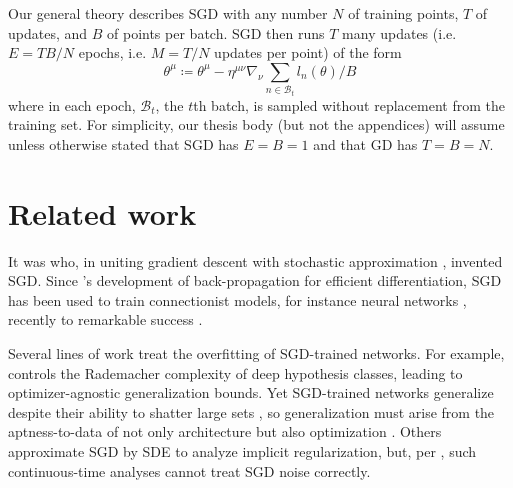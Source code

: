 \documentclass[openany, notitlepage, justified]{tufte-book}
\theoremstyle{plain}
\theoremstyle{definition}
\newcommand{\Bb}{\mathcal{B}}
\begin{document}

        Our general theory describes SGD with any number
             $N$ of training points,
             $T$ of updates, and 
             $B$ of points per batch.
        SGD then runs $T$ many updates (i.e. $E=TB/N$ epochs, i.e. $M=T/N$
        updates per point) of the form
        $$
            \theta^\mu
            \coloneqq
            \theta^\mu -
            \eta^{\mu\nu} \nabla_\nu
                \sum_{n\in \Bb_t} l_n(\theta) / B
        $$
        where in each epoch, $\Bb_t$, the $t$th batch, is sampled without
        replacement from the training set.
        For simplicity, our thesis body (but not the appendices) will assume
        unless otherwise stated that SGD has $E=B=1$ and that GD has
        $T=B=N$.


        \newpage
    \section{Related work} \label{sect:related}
    
        It was \citet{ki52} who, in uniting gradient descent \citep{ca47} with
        stochastic approximation \citep{ro51}, invented SGD.  Since \citet{we74}'s
        development of back-propagation for efficient differentiation, SGD has been
        used to train connectionist models, for instance neural networks \citep{bo91},
        recently to remarkable success \citep{le15}.
    
    
        Several lines of work treat the overfitting of SGD-trained
        networks.\cite{ne17a}  For example, \citet{ba17} controls the Rademacher
        complexity of deep hypothesis classes, leading to optimizer-agnostic
        generalization bounds.  Yet SGD-trained networks generalize despite their
        ability to shatter large sets \citep{zh17}, so generalization must arise
        from the aptness-to-data of not only architecture but also optimization
        \citep{ne17b}.  Others approximate SGD by SDE to analyze implicit
        regularization,\cite{ch18} but, per \citet{ya19a}, such
        continuous-time analyses cannot treat SGD noise correctly.
        
\end{document}
